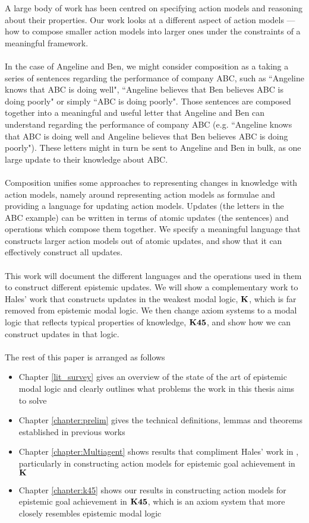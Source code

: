 A large body of work has been centred on specifying action models and reasoning
about their properties.
Our work looks at a different aspect of action models --- how to compose smaller action models
into larger ones under the constraints of a meaningful framework.\\
\\
In the case of Angeline and Ben, we might consider composition as a taking a series of sentences
regarding the performance of company ABC, such as ``Angeline knows that ABC is doing well", ``Angeline
believes that Ben believes ABC is doing poorly" or simply ``ABC is doing poorly".
Those sentences are composed together into a meaningful and useful letter that Angeline and Ben can
understand regarding the performance of company ABC (e.g. ``Angeline knows that ABC is doing well
and Angeline believes that Ben believes ABC is doing poorly").
These letters might in turn be sent to Angeline and Ben in bulk, as one large update to their knowledge
about ABC.\\
\\
Composition unifies some approaches to representing changes in knowledge with action models, namely
around representing action models as formulae and providing a language for updating action models.
Updates (the letters in the ABC example) can be written in terms of atomic updates (the sentences)
and operations which compose them together.
We specify a meaningful language that constructs larger action models out of atomic updates, and
show that it can effectively construct all updates.\\
\\
This work will document the different languages and the operations used in them to construct
different epistemic updates.
We will show a complementary work to Hales' \cite{hales13synthesis} work that constructs updates in the weakest modal logic,
$\bf K$, which is far removed from epistemic modal logic.
We then change axiom systems to a modal logic that reflects typical properties of knowledge,
$\bf K45$, and show how we can construct updates in that logic.\\
\\
The rest of this paper is arranged as follows
\begin{itemize}
	\item Chapter \ref{lit_survey} gives an overview of the state of the art of epistemic modal logic
		and clearly outlines what problems the work in this thesis aims to solve
	\item Chapter \ref{chapter:prelim} gives the technical definitions, lemmas and theorems
		established in previous works
	\item Chapter \ref{chapter:Multiagent} shows results that compliment Hales' work in
		\cite{hales13synthesis}, particularly in constructing action models for epistemic goal
		achievement in $\bf K$
	\item Chapter \ref{chapter:k45} shows our results in constructing action models for epistemic goal
		achievement in $\bf K45$, which is an axiom system that more closely resembles epistemic modal
		logic
\end{itemize}
